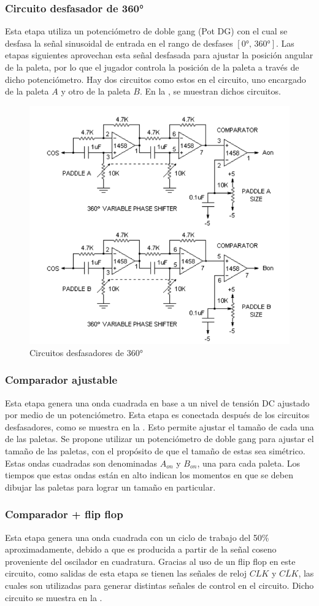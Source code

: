 \subsubsection{Circuito desfasador de 360°}
Esta etapa utiliza un potenciómetro de doble gang (Pot DG) con el cual se desfasa la señal sinusoidal de entrada en el rango de desfases $[0°,\,360°]$.
Las etapas siguientes aprovechan esta señal desfasada para ajustar la posición angular de la paleta, por lo que el jugador controla la posición de la paleta a través de dicho potenciómetro.
Hay dos circuitos como estos en el circuito, uno encargado de la paleta $A$ y otro de la paleta $B$.
En la , se muestran dichos circuitos.

\begin{figure}[H]
    \centering
    \includegraphics[width=0.5\linewidth]{figs/descripcion/desfasador}
    \caption{Circuitos desfasadores de 360° \cite{pong}}
    \label{desfasador}
\end{figure}

\subsubsection{Comparador ajustable}
Esta etapa genera una onda cuadrada en base a un nivel de tensión DC ajustado por medio de un potenciómetro. 
Esta etapa es conectada después de los circuitos desfasadores, como se muestra en la .
Esto permite ajustar el tamaño de cada una de las paletas.
Se propone utilizar un potenciómetro de doble gang para ajustar el tamaño de las paletas, con el propósito de que el tamaño de estas sea simétrico. 
Estas ondas cuadradas son denominadas $A_{on}$ y $B_{on}$, una para cada paleta. 
Los tiempos que estas ondas están en alto indican los momentos en que se deben dibujar las paletas para lograr un tamaño en particular. 

\subsubsection{Comparador + flip flop}
Esta etapa genera una onda cuadrada con un ciclo de trabajo del 50\% aproximadamente, debido a que es producida a partir de la señal coseno proveniente del oscilador en cuadratura.
Gracias al uso de un flip flop en este circuito, como salidas de esta etapa se tienen las señales de reloj $CLK$ y $\overline{CLK}$, las cuales son utilizadas para generar distintas señales de control en el circuito.
Dicho circuito se muestra en la .

